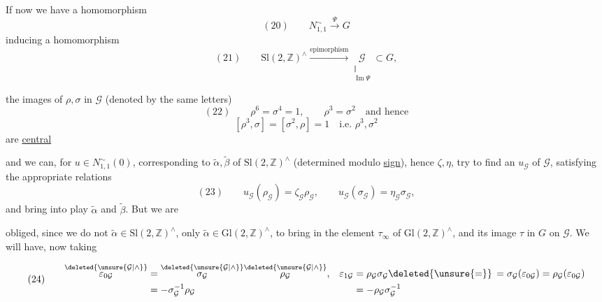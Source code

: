 If now we have a  homomorphism
\[
(20)\qquad N_{1,1}^{\sim}\xrightarrow{\Psi}G
\]
inducing a homomorphism
\[
(21)\qquad
\mathrm{Sl}(2,\mathbb Z)^\wedge
\xrightarrow{\text{epimorphism}}
\underset{\substack{\Vert\\\operatorname{Im}\Psi}}{\mathcal{G}}
\subset G,
\]

the images of $\rho,\sigma$ in $\mathcal{G}$
(denoted by the same letters)
\[
(22)\qquad
\rho^6=\sigma^4=1,\qquad
\rho^3=\sigma^2\quad\text{and hence}
\]
\[
[\rho^3,\sigma]=[\sigma^2,\rho]=1
\quad\text{i.e. }\rho^3,\sigma^2
\]
are \uline{central}


and we can, for $u\in N_{1,1}^{\sim}(0)$, corresponding to
 $\widetilde{\alpha},\widetilde{\beta}$ of
$\mathrm{Sl}(2,\mathbb Z)^\wedge$
(determined modulo \uline{sign}), hence $\zeta,\eta$,
try to find an 
$u_{\mathcal{G}}$ of $\mathcal{G}$,
satisfying the appropriate relations
\[
(23)\qquad
u_{\mathcal{G}}(\rho_{\mathcal{G}})
=\zeta_{\mathcal{G}}\rho_{\mathcal{G}},\qquad
u_{\mathcal{G}}(\sigma_{\mathcal{G}})
=\eta_{\mathcal{G}}\sigma_{\mathcal{G}},
\]
and bring into play  $\widetilde{\alpha}$ and
$\widetilde{\beta}$. But we are



obliged, since  we do not
$\widetilde{\alpha}\in\mathrm{Sl}(2,\mathbb Z)^\wedge$,
only $\widetilde{\alpha}\in\mathrm{Gl}(2,\mathbb Z)^\wedge$,
to bring in the element $\tau_\infty$ of
$\mathrm{Gl}(2,\mathbb Z)^\wedge$,
and  its image $\tau$ in $G$ on
$\mathcal{G}$. We will have, now taking

\[
(24)\qquad
\begin{aligned}
\overset{\deleted{\unsure{\mathcal{G}|\wedge}}}{\varepsilon_{0\mathcal{G}}}
&=\overset{\deleted{\unsure{\mathcal{G}|\wedge}}}{\sigma_{\mathcal{G}}}
\overset{\deleted{\unsure{\mathcal{G}|\wedge}}}{\rho_{\mathcal{G}}},
&\varepsilon_{1\mathcal{G}}&=\rho_{\mathcal{G}}\sigma_{\mathcal{G}}
\deleted{\unsure{=}}\,=\sigma_{\mathcal{G}}(\varepsilon_{0\mathcal{G}})
=\rho_{\mathcal{G}}(\varepsilon_{0\mathcal{G}})\\
&=-\sigma_{\mathcal{G}}^{-1}\rho_{\mathcal{G}}
&&=-\rho_{\mathcal{G}}\sigma_{\mathcal{G}}^{-1}
\end{aligned}
\]

